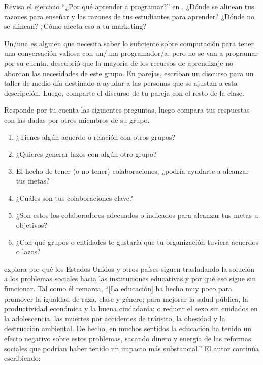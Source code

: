 
Revisa el ejercicio ``¿Por qué aprender a programar?'' en .
¿Dónde se alinean tus razones para enseñar y las razones de tus estudiantes para aprender?
¿Dónde no se alinean?
¿Cómo afecta eso a tu marketing?


Un/una 
es alguien que necesita saber lo suficiente sobre computación
para tener una conversación valiosa con un/una programador/a,
pero no se van a programar por su cuenta.
\cite{Wang2018} descubrió que la mayoría de los recursos de aprendizaje no abordan las necesidades de este grupo.
En parejas,
escriban un discurso para un taller de medio día destinado a ayudar a las personas que se ajustan a esta descripción.
Luego, comparte el discurso de tu pareja con el resto de la clase.

Responde por tu cuenta las siguientes preguntas,
luego compara tus respuestas con las dadas por otros miembros de su grupo.

\begin{enumerate}

\item
¿Tienes algún acuerdo o relación con otros grupos?

\item
¿Quieres generar lazos con algún otro grupo?

\item
El hecho de tener (o no tener) colaboraciones, 
¿podría ayudarte a alcanzar tus metas?

\item
¿Cuáles son tus colaboraciones clave?

\item
¿Son estos los colaboradores adecuados o indicados para alcanzar tus metas u objetivos?

\item
¿Con qué grupos o entidades te gustaría que tu organización
tuviera acuerdos o lazos?



\end{enumerate}


\cite{Laba2008} explora por qué los Estados Unidos y otros países
siguen trasladando la solución a los problemas sociales hacia las instituciones educativas 
y por qué eso sigue sin funcionar.
Tal como él remarca,
``[La educación] ha hecho muy poco para promover la igualdad de raza, clase y género;
para mejorar la salud pública, la productividad económica y la buena ciudadanía;
o reducir el sexo sin cuidados en la adolescencia, las muertes por accidentes de tránsito, la obesidad y la destrucción ambiental.
De hecho,
en muchos sentidos la educación ha tenido un efecto negativo sobre estos problemas,
sacando dinero y energía de las reformas sociales que podrían haber tenido un impacto más substancial.''
El autor continúa escribiendo: 

